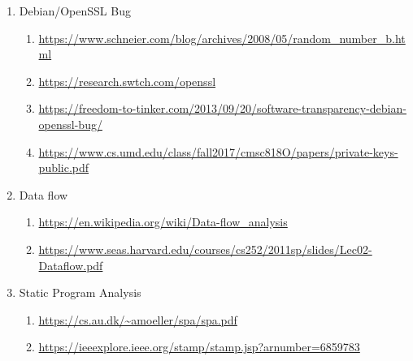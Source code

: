 \documentclass[letterpaper,twocolumn,10pt]{article}
\begin{document}
\begin{enumerate}
	\item Debian/OpenSSL Bug 
		\begin{enumerate}
			\item \url{https://www.schneier.com/blog/archives/2008/05/random_number_b.html}
			\item \url{https://research.swtch.com/openssl}
			\item \url{https://freedom-to-tinker.com/2013/09/20/software-transparency-debian-openssl-bug/}
			\item \url{https://www.cs.umd.edu/class/fall2017/cmsc818O/papers/private-keys-public.pdf}
		\end{enumerate}
	\item Data flow
		\begin{enumerate}
			\item \url{https://en.wikipedia.org/wiki/Data-flow_analysis}
			\item \url{https://www.seas.harvard.edu/courses/cs252/2011sp/slides/Lec02-Dataflow.pdf}
		\end{enumerate}
	\item Static Program Analysis
		\begin{enumerate}
            \item \url{https://cs.au.dk/~amoeller/spa/spa.pdf}
            \item \url{https://ieeexplore.ieee.org/stamp/stamp.jsp?arnumber=6859783}
		\end{enumerate}

\end{enumerate}


\end{document}
